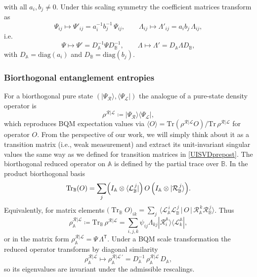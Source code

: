 \documentclass[11pt,a4paper]{article}
\newcommand{\be}{\begin{equation}}
\newcommand{\ee}{\end{equation}}
\begin{document}
with all $a_i,b_j \neq 0$. Under this scaling symmetry the coefficient matrices transform as
\begin{equation}
\Psi_{ij} \mapsto \Psi'_{ij} = a_i^{-1} b_j^{-1}\,\Psi_{ij},
\qquad
\Lambda_{ij} \mapsto \Lambda'_{ij} = a_i b_j\,\Lambda_{ij},
\end{equation}
i.e.
\begin{equation}
\Psi \mapsto \Psi' = D_\mathbb{A}^{-1}\Psi D_\mathbb{B}^{-1},
\qquad
\Lambda \mapsto \Lambda' = D_\mathbb{A} \Lambda D_\mathbb{B},
\end{equation}
with $D_\mathbb{A} = \mathrm{diag}(a_i)$ and $D_\mathbb{B} = \mathrm{diag}(b_j)$.
\subsubsection{Biorthogonal entanglement entropies}
For a biorthogonal pure state $(|\Psi_{\mathcal R}\rangle,\langle\Psi_{\mathcal L}|)$ the analogue of a pure-state density operator is \cite{Chang:2019nhn,Yang:2024hzt,Herviou:2019yfb}
\begin{equation}
\rho^{\mathcal{R|L}} \coloneq |\Psi_{\mathcal R}\rangle\langle\Psi_{\mathcal L}|,
\end{equation}
which reproduces BQM expectation values via $\langle O\rangle = \mathrm{Tr}(\rho^{\mathcal{R|L}} O)/\mathrm{Tr}\,\rho^{\mathcal{R|L}}$ for operator $O$. From the perspective of our work, we will simply think about it as a transition matrix (i.e., weak measurement) and extract its unit-invariant singular values the same way as we defined for transition matrices in \cref{UISVDprepost}. The biorthogonal reduced operator on $\mathbb A$ is defined by the partial trace over $\mathbb B$. In the product biorthogonal basis 
\be
\operatorname{Tr}_\mathbb B(O)
=\sum_{j}\Bigl(I_\mathbb A\otimes\langle \mathcal L_\mathbb B^{\,j}|\Bigr)\,O\,\Bigl(I_\mathbb A\otimes|\mathcal R_\mathbb B^{\,j}\rangle\Bigr).
\ee 
Equivalently, for matrix elements \(\bigl(\operatorname{Tr}_\mathbb B O\bigr)_{ik}
=\sum_{j}\,\langle \mathcal L_\mathbb A^{\,i} \mathcal L_\mathbb B^{\,j}\,|\,O\,|\,\mathcal R_\mathbb A^{\,k} \mathcal R_\mathbb B^{\,j}\rangle\). Thus
\begin{equation}
\rho_\mathbb{A}^{\mathcal{R|L}} \coloneq \mathrm{Tr}_\mathbb{B}\,\rho^{\mathcal{R|L}}=\sum_{i,j,k}\psi_{ij}\Lambda_{kj}|\mathcal{R}^\mathbb{A}_{i}\rangle \langle \mathcal{L}^\mathbb{A}_{k}|, \label{rhoRLA}
\end{equation}
or in the matrix form $\rho_\mathbb{A}^{\mathcal{R|L}} = \Psi\,\Lambda^{\mathsf T}$. Under a BQM scale transformation the reduced operator transforms by diagonal similarity
\begin{equation}\label{eq:diag-similarity}
\rho_\mathbb{A}^{\mathcal{R|L}} \mapsto
\rho_\mathbb{A}^{\mathcal{R|L}\,'}
= D_\mathbb{A}^{-1}\,\rho_\mathbb{A}^{\mathcal{R|L}}\,D_\mathbb{A},
\end{equation}
so its eigenvalues are invariant under the admissible rescalings. 
\end{document}
